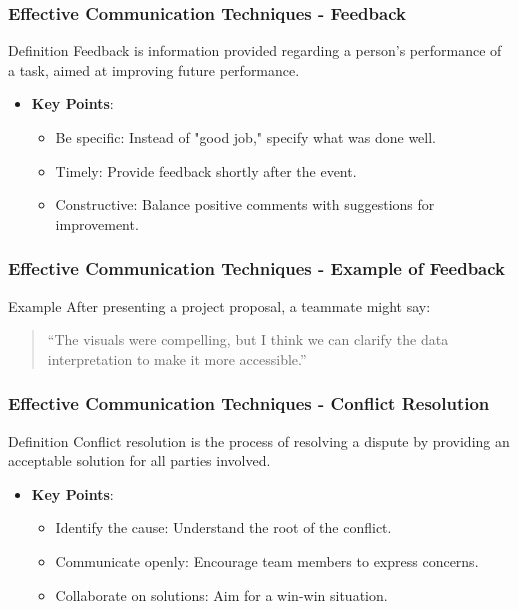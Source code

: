 \documentclass[aspectratio=169]{beamer}
\begin{document}
\begin{frame}[fragile]
    \frametitle{Effective Communication Techniques - Feedback}
    \begin{block}{Definition}
        Feedback is information provided regarding a person's performance of a task, aimed at improving future performance.
    \end{block}
    \begin{itemize}
        \item \textbf{Key Points}:
        \begin{itemize}
            \item Be specific: Instead of "good job," specify what was done well.
            \item Timely: Provide feedback shortly after the event.
            \item Constructive: Balance positive comments with suggestions for improvement.
        \end{itemize}
    \end{itemize}
\end{frame}

\begin{frame}[fragile]
    \frametitle{Effective Communication Techniques - Example of Feedback}
    \begin{block}{Example}
        After presenting a project proposal, a teammate might say:
        \begin{quote}
            “The visuals were compelling, but I think we can clarify the data interpretation to make it more accessible.”
        \end{quote}
    \end{block}
\end{frame}

\begin{frame}[fragile]
    \frametitle{Effective Communication Techniques - Conflict Resolution}
    \begin{block}{Definition}
        Conflict resolution is the process of resolving a dispute by providing an acceptable solution for all parties involved.
    \end{block}
    \begin{itemize}
        \item \textbf{Key Points}:
        \begin{itemize}
            \item Identify the cause: Understand the root of the conflict.
            \item Communicate openly: Encourage team members to express concerns.
            \item Collaborate on solutions: Aim for a win-win situation.
        \end{itemize}
    \end{itemize}
\end{frame}
\end{document}
